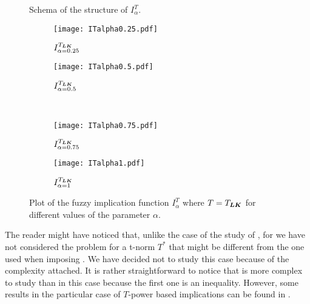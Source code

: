 \begin{example}
\begin{figure}[htp!]
		\caption{Schema of the structure of $I_{\alpha}^T$.}\label{fig:IalphaT}
	\end{figure}
	\begin{figure}[t!]
		\centering
		\begin{subfigure}[t]{0.35\linewidth}\vspace{0pt}
			\centering
			\texttt{[image: ITalpha0.25.pdf]}
			\caption{$I_{\alpha=0.25}^{T_{\bm{LK}}}$}	
		\end{subfigure}%
		\begin{subfigure}[t]{0.35\linewidth}\vspace{0pt}
			\centering
			\texttt{[image: ITalpha0.5.pdf]}
			\caption{$I_{\alpha=0.5}^{T_{\bm{LK}}}$}
		\end{subfigure}\\ \vspace{0.5cm}
		\begin{subfigure}[t]{0.35\linewidth}\vspace{0pt}
			\centering
			\texttt{[image: ITalpha0.75.pdf]}
			\caption{$I_{\alpha=0.75}^{T_{\bm{LK}}}$}		
		\end{subfigure}%
		\begin{subfigure}[t]{0.35\linewidth}\vspace{0pt}
			\centering
			\texttt{[image: ITalpha1.pdf]}
			\caption{$I_{\alpha=1}^{T_{\bm{LK}}}$}	
		\end{subfigure}
		\caption{Plot of the fuzzy implication function $I^T_{\alpha}$ where $T=T_{\bm{LK}}$ for different values of the parameter $\alpha$.}\label{figure:ITLKalpha}
	\end{figure}
\end{example}
\begin{remark}
	The reader might have noticed that, unlike the case of the study of \LI, for \TC we have not considered the problem for a t-norm $T^*$ that might be different from the one used when imposing \PIT. We have decided not to study this case because of the complexity attached. It is rather straightforward to notice that \TC is more complex to study than \LI in this case because the first one is an inequality. However, some results in the particular case of $T$-power based implications can be found in \cite{Li2022,Peng2022}.
\end{remark}

